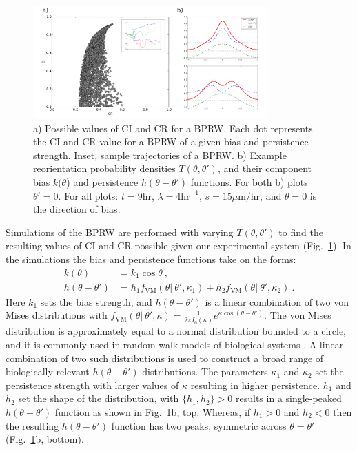\begin{figure}[ht]
    \centering
    \includegraphics[width=0.80\textwidth]{../fig/ch2_fig6.png}
    \caption{a) Possible values of CI and CR for a BPRW. Each dot represents the CI and CR value for a BPRW of a given bias and persistence strength. Inset, sample trajectories of a BPRW. b) Example reorientation probability densities $T(\theta,\theta')$, and their component bias $k(\theta$) and persistence $h(\theta-\theta')$ functions. For both b) plots $\theta'=0$. For all plots: $t = 9\text{hr}$, $\lambda = 4 \text{hr}^{-1}$, $s = 15 \mu\text{m/hr}$, and $\theta=0$ is the direction of bias.}
    \label{fig:ch2_6}
\end{figure}

Simulations of the BPRW are performed with varying $T(\theta,\theta')$ to find the resulting values of CI and CR possible given our experimental system (Fig.\ \ref{fig:ch2_6}). In the simulations the bias and persistence functions take on the forms:
\begin{align}
    k(\theta) &= k_1 \cos\theta \ , \\
    h(\theta-\theta') &= h_1 f_\text{VM}(\theta | \ \theta', \kappa_1) + h_2 f_\text{VM}(\theta | \ \theta', \kappa_2) \ .
\end{align}
Here $k_1$ sets the bias strength, and $h(\theta-\theta')$ is a linear combination of two von Mises distributions with
$f_\text{VM}(\theta | \ \theta', \kappa) = \frac{1}{2\pi I_0(\kappa)} e^{\kappa \cos(\theta-\theta')}$.
The von Mises distribution is approximately equal to a normal distribution bounded to a circle, and it is commonly used in random walk models of biological systems \cite{codling2008random}. A linear combination of two such distributions is used to construct a broad range of biologically relevant $h(\theta-\theta')$ distributions.
The parameters $\kappa_1$ and $\kappa_2$ set the persistence strength with larger values of $\kappa$ resulting in higher persistence. $h_1$ and $h_2$ set the shape of the distribution, with $\{h_1,h_2\} > 0$ results in a single-peaked $h(\theta-\theta')$ function as shown in Fig.\ \ref{fig:ch2_6}b, top. Whereas, if $h_1> 0$ and $h_2<0$ then the resulting $h(\theta-\theta')$ function has two peaks, symmetric across $\theta=\theta'$ (Fig.\ \ref{fig:ch2_6}b, bottom).

